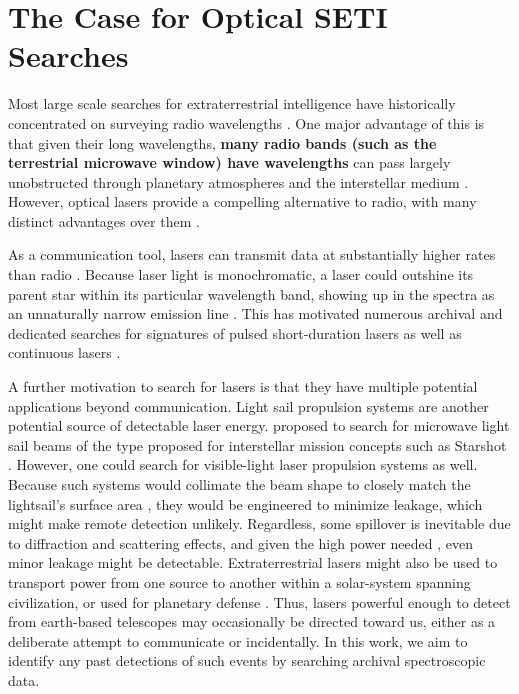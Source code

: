 \documentclass[linenumbers]{aastex701}
\providecommand{\DIFadd}[1]{{\bf #1}} %
\providecommand{\DIFaddbegin}{} %
\providecommand{\DIFaddend}{} %
\begin{document}
\section{The Case for Optical SETI Searches}
Most large scale searches for extraterrestrial intelligence have historically concentrated on surveying radio wavelengths \citep{Gray_2017,OZMAII,LAMPTON1992189,Price_2020,PeterMa,Wright_2018}. One major advantage of this is that given their long wavelengths,  \DIFaddbegin \DIFadd{many radio bands (such as the terrestrial microwave window) have wavelengths }\DIFaddend can pass largely unobstructed through planetary atmospheres and the interstellar medium \citep{COCCONI_MORRISON_1959}. However, optical lasers provide a compelling alternative to radio, with many distinct advantages over them \citep{caseforopticalseti}. 

As a communication tool, lasers can transmit data at substantially higher rates than radio \citep{Tellis_2017,Kingsley}.  %
Because laser light is monochromatic, a laser could outshine its parent star within its particular wavelength band, showing up in the spectra as an unnaturally narrow emission line \citep{TOWNES_SCHWARTZ_1961,STANTON201992}. This has motivated numerous archival and dedicated searches for signatures of pulsed short-duration lasers \citep{Shelley_Wright,Howard_2004,Maire_2019} as well as continuous lasers \citep{Tellis_2017,Lipman_2019,Zuckerman_2023,Reines_2002,Marcy_2021}.

A further motivation to search for lasers is that they have multiple potential applications beyond communication. Light sail propulsion systems are another potential source of detectable laser energy. \cite{Guillochon_2015} proposed to search for microwave light sail beams of the type proposed for interstellar mission concepts such as Starshot \citep{STARSHOT}. However, one could search for visible-light laser propulsion systems as well. Because such systems would collimate the beam shape to closely match the lightsail's surface area \citep{STARSHOT}, they would be engineered to minimize leakage, which might make remote detection unlikely. Regardless, some spillover is inevitable due to diffraction and scattering effects, and given the high power needed , even minor leakage might be detectable.  Extraterrestrial lasers might also be used to transport power from one source to another within a solar-system spanning civilization, or used for planetary defense \citep{Bible_Johansson_Hughes_Lubin_2013}. Thus, lasers powerful enough to detect from earth-based telescopes may occasionally be directed toward us, either as a deliberate attempt to communicate or incidentally. In this work, we aim to identify any past detections of such events by searching archival spectroscopic data.
\end{document}
